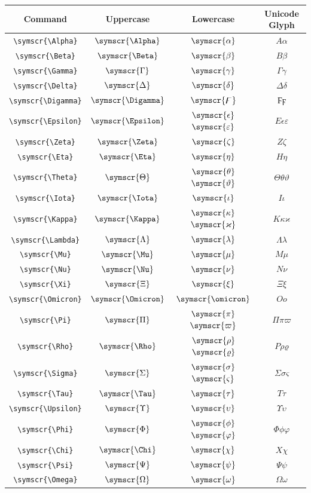 \documentclass[12pt,a4paper]{article}
\begin{document}
\begin{longtable}{|c|c|c|c|}
\hline
\textbf{Command} & \textbf{Uppercase} & \textbf{Lowercase} & \textbf{Unicode Glyph} \\
\hline
\verb|\symscr{\Alpha}| & $\symscr{\Alpha}$ & $\symscr{\alpha}$ & $ Α 𝛼 $ \\
\verb|\symscr{\Beta}| & $\symscr{\Beta}$ & $\symscr{\beta}$ & $ Β 𝛽 $ \\
\verb|\symscr{\Gamma}| & $\symscr{\Gamma}$ & $\symscr{\gamma}$ & $ Γ 𝛾 $ \\
\verb|\symscr{\Delta}| & $\symscr{\Delta}$ & $\symscr{\delta}$ & $ Δ 𝛿 $ \\
\verb|\symscr{\Digamma}| & $\symscr{\Digamma}$ & $\symscr{\digamma}$ & $ Ϝ ϝ $ \\
\verb|\symscr{\Epsilon}| & $\symscr{\Epsilon}$ & $\symscr{\epsilon}$ $\symscr{\varepsilon}$ & $ Ε 𝜖 𝜀 $ \\
\verb|\symscr{\Zeta}| & $\symscr{\Zeta}$ & $\symscr{\zeta}$ & $ Ζ 𝜁 $ \\
\verb|\symscr{\Eta}| & $\symscr{\Eta}$ & $\symscr{\eta}$ & $ Η 𝜂 $ \\
\verb|\symscr{\Theta}| & $\symscr{\Theta}$ & $\symscr{\theta}$ $\symscr{\vartheta}$ & $ Θ 𝜃 𝜗 $ \\
\verb|\symscr{\Iota}| & $\symscr{\Iota}$ & $\symscr{\iota}$ & $ Ι 𝜄 $ \\
\verb|\symscr{\Kappa}| & $\symscr{\Kappa}$ & $\symscr{\kappa}$ $\symscr{\varkappa}$ & $ Κ 𝜅 𝜘 $ \\
\verb|\symscr{\Lambda}| & $\symscr{\Lambda}$ & $\symscr{\lambda}$ & $ Λ 𝜆 $ \\
\verb|\symscr{\Mu}| & $\symscr{\Mu}$ & $\symscr{\mu}$ & $ Μ 𝜇 $ \\
\verb|\symscr{\Nu}| & $\symscr{\Nu}$ & $\symscr{\nu}$ & $ Ν 𝜈 $ \\
\verb|\symscr{\Xi}| & $\symscr{\Xi}$ & $\symscr{\xi}$ & $ Ξ 𝜉 $ \\
\verb|\symscr{\Omicron}| & $\symscr{\Omicron}$ & $\symscr{\omicron}$ & $ Ο 𝜊 $ \\
\verb|\symscr{\Pi}| & $\symscr{\Pi}$ & $\symscr{\pi}$ $\symscr{\varpi}$ & $ Π 𝜋 𝜛 $ \\
\verb|\symscr{\Rho}| & $\symscr{\Rho}$ & $\symscr{\rho}$ $\symscr{\varrho}$ & $ Ρ 𝜌 𝜚 $ \\
\verb|\symscr{\Sigma}| & $\symscr{\Sigma}$ & $\symscr{\sigma}$ $\symscr{\varsigma}$ & $ Σ 𝜎 𝜍 $ \\
\verb|\symscr{\Tau}| & $\symscr{\Tau}$ & $\symscr{\tau}$ & $ Τ 𝜏 $ \\
\verb|\symscr{\Upsilon}| & $\symscr{\Upsilon}$ & $\symscr{\upsilon}$ & $ Υ 𝜐 $ \\
\verb|\symscr{\Phi}| & $\symscr{\Phi}$ & $\symscr{\phi}$ $\symscr{\varphi}$ & $ Φ 𝜙 𝜑 $ \\
\verb|\symscr{\Chi}| & $\symscr{\Chi}$ & $\symscr{\chi}$ & $ Χ 𝜒 $ \\
\verb|\symscr{\Psi}| & $\symscr{\Psi}$ & $\symscr{\psi}$ & $ Ψ 𝜓 $ \\
\verb|\symscr{\Omega}| & $\symscr{\Omega}$ & $\symscr{\omega}$ & $ Ω 𝜔 $ \\
\hline
\end{longtable}
\end{document}
